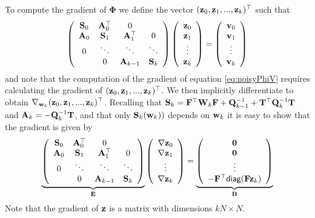 \documentclass[11pt]{article}
\newcommand{\bfA}	{{\bf{A}}}
\newcommand{\bfB}	{{\bf{B}}}
\newcommand{\bfE}	{{\bf{E}}}
\newcommand{\bfF}	{{\bf{F}}}
\newcommand{\bfQ}	{{\bf{Q}}}
\newcommand{\bfS}	{{\bf{S}}}
\newcommand{\bfT}	{{\bf{T}}}
\newcommand{\bfW}	{{\bf{W}}}
\newcommand{\bfv}	{{\bf{v}}}
\newcommand{\bfw}	{{\bf{w}}}
\newcommand{\bfz}	{{\bf{z}}}
\newcommand{\bfPhi}     {{\boldsymbol \Phi}}
\newcommand {\zero}  { {\bf 0} }
\newcommand{\grad}	{\ensuremath {{\bf{ \nabla}}}}
\begin{document}
To compute the gradient of $\bfPhi$ we define the vector  $(\bfz_0,\bfz_1,...,\bfz_k)^{\top}$ such that
\begin{equation}
\left(\begin{array}{cccc}
 \bfS_0 &  \bfA^{\top}_0 & 0 & \\
 \bfA_0 & \bfS_1 & \bfA^{\top}_1 & 0 \\
 0 & \ddots & \ddots & \ddots \\
 & 0 & \bfA_{k-1} & \bfS_k
  \end{array}\right)
  \left(\begin{array}{c} \bfz_0 \\ \bfz_1\\ \vdots\\ \bfz_k \end{array}\right)
  =
  \left(\begin{array}{c} \bfv_0 \\ \bfv_1\\ \vdots\\ \bfv_k \end{array}\right)
\end{equation}
and note that the computation of the gradient of equation \eqref{eq:noisyPhiV} requires calculating the gradient of $(\bfz_0,\bfz_1,...,\bfz_k)^{\top}$. We then implicitly differentiate to obtain $\nabla_{\bfw_k} (\bfz_0,\bfz_1,...,\bfz_k)^{\top}$. Recalling that $\bfS_k = \bfF^{\top}\bfW_{k}\bfF + \bfQ^{-1}_{k-1} + \bfT^{\top}\bfQ^{-1}_{k}\bfT $  and $\bfA_k = -\bfQ^{-1}_k \bfT$, and that only $\bfS_k(\bfw_k))$ depends on $\bfw_k$ it is easy to show that the gradient is given by 
\begin{equation}
\label{eq:gradSys}
\underbrace{\left(\begin{array}{cccc}
 \bfS_0 &  \bfA^{\top}_0 & 0 & \\
 \bfA_0 & \bfS_1 & \bfA^{\top}_1 & 0 \\
 0 & \ddots & \ddots & \ddots \\
 & 0 & \bfA_{k-1} & \bfS_k
  \end{array}\right)}_{\bfE}
  \left(\begin{array}{c} \grad\bfz_0 \\ \grad\bfz_1\\ \vdots\\ \grad\bfz_k \end{array}\right)
  =
  \underbrace{\left(\begin{array}{c} \zero \\ \zero\\ \vdots\\ -\bfF^{\top}{\sf diag}(\bfF\bfz_k) \end{array}\right)}_{\bfB}
\end{equation}
Note that the gradient of $\bfz$ is a matrix with dimensions $kN\times  N$. 
\end{document}
